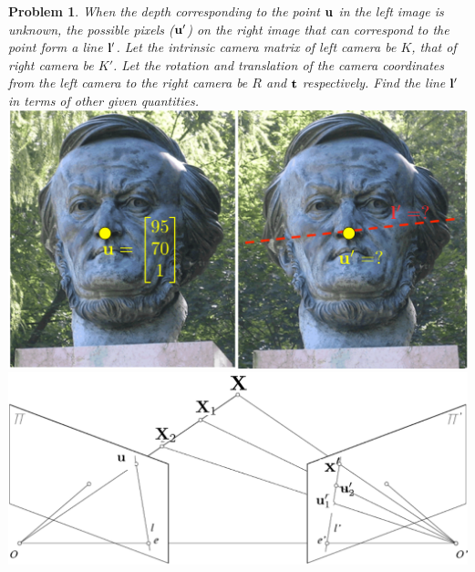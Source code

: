 \documentclass[times,singlecolumn]{article}
\newtheorem{prob}{Problem}
\begin{document}
\begin{prob}
  When the depth corresponding to the point $\mathbf{u}$ in the left image is unknown,
  the possible
  pixels ($\mathbf{u}'$) on the right image that can correspond to  the point form a
  line $\mathbf{l}'$. Let the intrinsic camera matrix of left camera be $K$, that of
  right camera be $K'$. Let the rotation and translation of the camera
coordinates from the left camera to the right camera be $R$ and $\mathbf{t}$
respectively. Find the line $\mathbf{l}'$  in terms of other given quantities.
  \\
  \includegraphics[width=0.5\linewidth]{media/stereo-images.png.pdf}\includegraphics[width=0.5\linewidth]{media/epipolar-constraint.png.pdf}
\end{prob}
\end{document}
